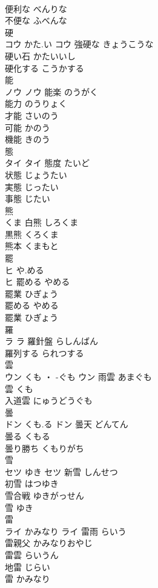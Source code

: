 \documentclass[8pt]{extreport}
\begin{document}
\begin{CJK}{UTF8}{min}
\\	便利な	べんりな	
\\	不便な	ふべんな	
\\	硬	
\\	コウ	かた.い	コウ	強硬な	きょうこうな	
\\	硬い石	かたいいし	
\\	硬化する	こうかする	
\\	能	
\\	ノウ		ノウ	能楽	のうがく	
\\	能力	のうりょく	
\\	才能	さいのう	
\\	可能	かのう	
\\	機能	きのう	
\\	態	
\\	タイ		タイ	態度	たいど	
\\	状態	じょうたい	
\\	実態	じったい	
\\	事態	じたい	
\\	熊	
\\	くま														白熊	しろくま	
\\	黒熊	くろくま	
\\	熊本	くまもと	
\\	罷	
\\	ヒ	や.める
\\	ヒ	罷める	やめる	
\\	罷業	ひぎょう	
\\	罷める	やめる	
\\	罷業	ひぎょう	
\\	羅	
\\	ラ		ラ	羅針盤	らしんばん	
\\	羅列する	られつする	
\\	雲	
\\	ウン	くも ・ -ぐも	ウン	雨雲	あまぐも	
\\	雲	くも	
\\	入道雲	にゅうどうぐも	
\\	曇	
\\	ドン	くも.る	ドン	曇天	どんてん	
\\	曇る	くもる	
\\	曇り勝ち	くもりがち	
\\	雪	
\\	セツ	ゆき	セツ	新雪	しんせつ	
\\	初雪	はつゆき	
\\	雪合戦	ゆきがっせん	
\\	雪	ゆき	
\\	雷	
\\	ライ	かみなり	ライ	雷雨	らいう	
\\	雷親父	かみなりおやじ	
\\	雷雲	らいうん	
\\	地雷	じらい	
\\	雷	かみなり	
\end{CJK}
\end{document}
